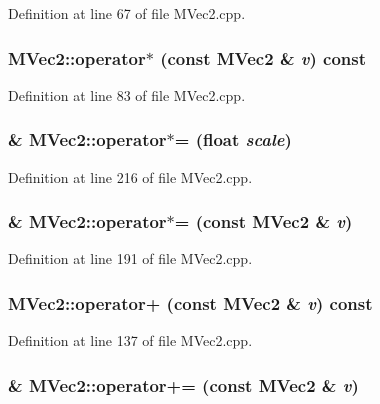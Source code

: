 Definition at line 67 of file MVec2.cpp.\hypertarget{class_m_vec2_f9ec6d8fd59885aad4db6d30795a9b0b}{
\subsubsection[{operator$\ast$}]{ MVec2::operator$\ast$ (const {\bf MVec2} \& {\em v}) const}}
\label{class_m_vec2_f9ec6d8fd59885aad4db6d30795a9b0b}




Definition at line 83 of file MVec2.cpp.\hypertarget{class_m_vec2_70d977f70e6f277fd2a918a90f803d0b}{
\subsubsection[{operator$\ast$=}]{ \& MVec2::operator$\ast$= (float {\em scale})}}
\label{class_m_vec2_70d977f70e6f277fd2a918a90f803d0b}




Definition at line 216 of file MVec2.cpp.\hypertarget{class_m_vec2_323651a51ffe6608ba52368916c691c8}{
\subsubsection[{operator$\ast$=}]{ \& MVec2::operator$\ast$= (const {\bf MVec2} \& {\em v})}}
\label{class_m_vec2_323651a51ffe6608ba52368916c691c8}




Definition at line 191 of file MVec2.cpp.\hypertarget{class_m_vec2_bb82987dba0a4e140357d3d04c1f9770}{
\subsubsection[{operator+}]{ MVec2::operator+ (const {\bf MVec2} \& {\em v}) const}}
\label{class_m_vec2_bb82987dba0a4e140357d3d04c1f9770}




Definition at line 137 of file MVec2.cpp.\hypertarget{class_m_vec2_843631a6f52ac62d6e8af05acb26ffc2}{
\subsubsection[{operator+=}]{ \& MVec2::operator+= (const {\bf MVec2} \& {\em v})}}
\label{class_m_vec2_843631a6f52ac62d6e8af05acb26ffc2}




